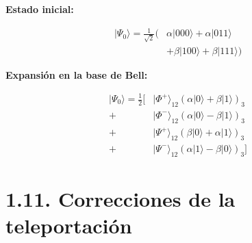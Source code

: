 \documentclass{afitdefense}
\begin{document}
\begin{Center}

\begin{minipage}[c]{0.43\textwidth}
\centering
\small

\textbf{Estado inicial:}

\[
\begin{aligned}
|\Psi_0\rangle =
\frac{1}{\sqrt{2}}\big(
&\alpha|000\rangle+\alpha|011\rangle\\
&+\beta|100\rangle+\beta|111\rangle
\big)
\end{aligned}
\]

\end{minipage}
\hfill
\begin{minipage}[c]{0.54\textwidth}
\centering
\small

\textbf{Expansión en la base de Bell:}

\[
\begin{aligned}
|\Psi_0\rangle=\frac{1}{2}\Big[
&|\Phi^+\rangle_{12}
(\alpha|0\rangle+\beta|1\rangle)_3\\[4pt]
+&|\Phi^-\rangle_{12}
(\alpha|0\rangle-\beta|1\rangle)_3\\[4pt]
+&|\Psi^+\rangle_{12}
(\beta|0\rangle+\alpha|1\rangle)_3\\[4pt]
+&|\Psi^-\rangle_{12}
(\alpha|1\rangle-\beta|0\rangle)_3
\Big]
\end{aligned}
\]

\end{minipage}

\end{Center}



\section{1.11. Correcciones de la teleportación}
\end{document}
